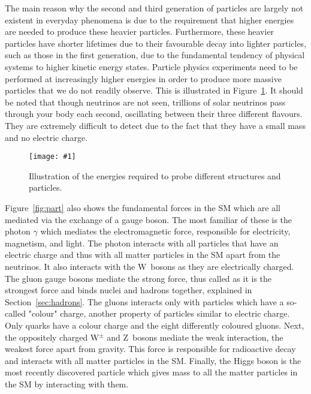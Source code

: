 \documentclass[twocolumn]{article}
\newcommand{\insertFigure}[1]{%
   \texttt{[image: \#1]}%
}
\begin{document}
The main reason why the second and third generation of particles are largely not existent in everyday phenomena is due to the requirement that higher energies are needed to produce these heavier particles. Furthermore, these heavier particles have shorter lifetimes due to their favourable decay into lighter particles, such as those in the first generation, due to the fundamental tendency of physical systems to higher kinetic energy states. Particle physics experiments need to be performed at increasingly higher energies in order to produce more massive particles that we do not readily observe. This is illustrated in Figure~\ref{fig:energy}. It should be noted that though neutrinos are not seen, trillions of solar neutrinos pass through your body each second, oscillating between their three different flavours.~\cite{Thompson} They are extremely difficult to detect due to the fact that they have a small mass and no electric charge. \\
\begin{figure}[!h]
	\centering
	\insertFigure{energy.png}
	\caption{Illustration of the energies required to probe different structures and particles.~\cite{Thompson}}
	\label{fig:energy}
\end{figure}
\par Figure~\ref{fig:part} also shows the fundamental forces in the SM which are all mediated via the exchange of a gauge boson. The most familiar of these is the photon $\gamma$ which mediates the electromagnetic force, responsible for electricity, magnetism, and light. The photon interacts with all particles that have an electric charge and thus with all matter particles in the SM apart from the neutrinos. It also interacts with the W~bosons as they are electrically charged. The gluon gauge bosons mediate the strong force, thus called as it is the strongest force and binds nuclei and hadrons together, explained in Section~\ref{sec:hadrons}. The gluons interacts only with particles which have a so-called "colour" charge, another property of particles similar to electric charge. Only quarks have a colour charge and the eight differently coloured gluons. Next, the oppositely charged W$^{\pm}$ and Z~bosons mediate the weak interaction, the weakest force apart from gravity. This force is responsible for radioactive decay and interacts with all matter particles in the SM. Finally, the Higgs boson is the most recently discovered particle which gives mass to all the matter particles in the SM by interacting with them.
\end{document}
